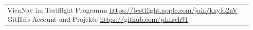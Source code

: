 \begin{longtable}{p{}|p{}}
	VienNav im Testflight Programm \newline
	\small{\url{https://testflight.apple.com/join/kxyfo2nV}} \newline
	GitHub Account und Projekte \newline
	\small{\url{https://github.com/philsch91}} \newline
\end{longtable}
